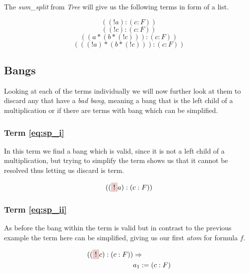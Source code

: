 

The \emph{sum\_split} from \emph{Tree} will give us the following terms in form of a list. 

\begin{equation}\label{eq:sp_i}	
	((!a):(c:F))
\end{equation}
\begin{equation}\label{eq:sp_ii}	
	((!c):(c:F))
\end{equation}	
\begin{equation}\label{eq:sp_iii}	
	((a *(b* (! c))):(c:F))											
\end{equation}
\begin{equation}\label{eq:sp_iv}	
	(((! a)*(b* (! c))):(c:F))												
\end{equation}

\subsection{Bangs}
Looking at each of the terms individually we will now further look at them to discard any that have a \emph{bad bang}, meaning a bang that is the left child of a multiplication or if there are terms with bang which can be simplified.

\subsubsection[First term]{Term \ref{eq:sp_i}}
In this term we find a bang which is valid, since it is not a left child of a multiplication, but trying to simplify the term shows us that it cannot be resolved thus letting us discard is term.

\begin{equation*}
	((\tikz[baseline]{\node[fill=red!20,anchor=base] (t1){$!$};}a):(c:F)) 
\end{equation*}

\subsubsection[Second term]{Term \ref{eq:sp_ii}}
As before the bang within the term is valid but in contrast to the previous example the term here can be simplified, giving us our first \emph{atom} for formula $f.$

\begin{equation}\label{eq:a_1}
	\begin{split}
	((\tikz[baseline]{\node[fill=red!20,anchor=base] (t1){$!$};} c):(c:F)) & \Rightarrow \\
	& a_1 := (c:F)
	\end{split}
\end{equation}

